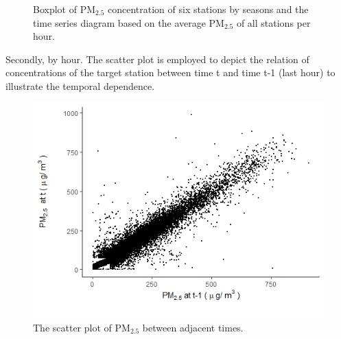 \documentclass[12pt]{article}
\numberwithin{equation}{section}
\begin{document}
\begin{figure}[H]
	\centering
	\caption{\footnotesize  Boxplot of PM$_{2.5}$ concentration of six stations by seasons and the time series diagram based on the average PM$_{2.5}$ of all stations per hour.}
	\label{fig:Seasonal trend}
\end{figure}


Secondly, by hour. The scatter plot is employed to depict the relation of concentrations of the target station between time t and time t-1 (last hour) to illustrate the temporal dependence. 

\begin{figure}[htbp]
	\centering
	\includegraphics[width=12cm]{newtime.png}
	\caption{\footnotesize The scatter plot of PM$_{2.5}$ between adjacent times.}
	\label{fig:time}
\end{figure}
\end{document}
